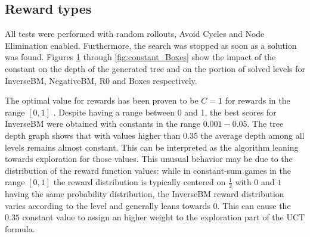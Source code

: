 \subsection{Reward types}
All tests were performed with random rollouts, Avoid Cycles and Node Elimination enabled. Furthermore, the search was stopped as soon as a solution was found. Figures \ref{fig:constant_InverseBM} through \ref{fig:constant_Boxes} show the impact of the constant on the depth of the generated tree and on the portion of solved levels for InverseBM, NegativeBM, R0 and Boxes respectively.

\medskip\noindent
The optimal value for rewards has been proven to be $C = 1$ for rewards in the range $[0,1]$ \cite{Kocsis:2006:BBM:2091602.2091633}.
Despite having a range between 0 and 1, the best scores for InverseBM were obtained with constants in the range $0.001-0.05$. The tree depth graph shows that with values higher than 0.35 the average depth among all levels remains almost constant. This can be interpreted as the algorithm leaning towards exploration for those values. This unusual behavior may be due to the distribution of the reward function values: while in constant-sum games in the range $[0,1]$ the reward distribution is typically centered on $\frac{1}{2}$ with $0$ and $1$ having the same probability distribution, the InverseBM reward distribution varies according to the level and generally leans towards $0$. This can cause the $0.35$ constant value to assign an higher weight to the exploration part of the UCT formula.
\clearpage

\begin{figure}[!h]
\centering
{}
\caption[InverseBM solved levels rate and tree depth]{}
\label{fig:constant_InverseBM}
\end{figure}
\clearpage

